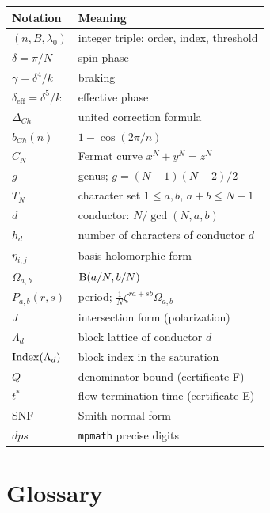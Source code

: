 \begin{center}
\small
\begin{tabular}{@{}l l@{}}
\toprule
Notation & Meaning \\
\midrule
$(n,B,\lambda_0)$ & integer triple: order, index, threshold \\
$\delta=\pi/N$ & spin phase \\
$\gamma=\delta^4/k$ & braking \\
$\delta_{\mathrm{eff}}=\delta^5/k$ & effective phase \\
$\Delta_{Ch}$ & united correction formula \\
$b_{Ch}(n)$ & $1-\cos(2\pi/n)$ \\
$C_N$ & Fermat curve $x^N+y^N=z^N$ \\
$g$ & genus; $g=(N-1)(N-2)/2$ \\
$T_N$ & character set $1\le a,b$, $a+b\le N-1$ \\
$d$ & conductor: $N/\gcd(N,a,b)$ \\
$h_d$ & number of characters of conductor $d$ \\
$\eta_{i,j}$ & basis holomorphic form \\
$\Omega_{a,b}$ & $\mathrm{B}(a/N,b/N)$ \\
$P_{a,b}(r,s)$ & period; $\tfrac1N\zeta^{ra+sb}\Omega_{a,b}$ \\
$J$ & intersection form (polarization) \\
$\Lambda_d$ & block lattice of conductor $d$ \\
$\operatorname{Index}(\Lambda_d)$ & block index in the saturation \\
$Q$ & denominator bound (certificate F) \\
$t^*$ & flow termination time (certificate E) \\
SNF & Smith normal form \\
$dps$ & \texttt{mpmath} precise digits \\
\bottomrule
\end{tabular}
\end{center}

\section{Glossary}\label{app:glossary}

